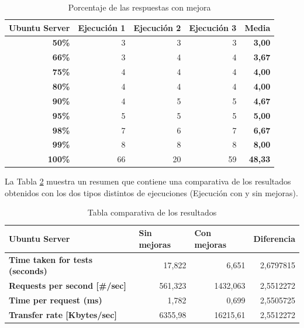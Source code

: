 \begin{table}[H]
	\centering
	\begin{tabular}{rrrrr}
		\multicolumn{1}{l}{\textbf{Ubuntu Server}} & \multicolumn{1}{l}{\textbf{Ejecución 1}} & \multicolumn{1}{l}{\textbf{Ejecución 2}} & \multicolumn{1}{l}{\textbf{Ejecución 3}} & \multicolumn{1}{l}{\textbf{Media}} \\
		\midrule
		\textbf{50\%} & 3     & 3     & 3     & \textbf{3,00} \\
		\textbf{66\%} & 3     & 4     & 4     & \textbf{3,67} \\
		\textbf{75\%} & 4     & 4     & 4     & \textbf{4,00} \\
		\textbf{80\%} & 4     & 4     & 4     & \textbf{4,00} \\
		\textbf{90\%} & 4     & 5     & 5     & \textbf{4,67} \\
		\textbf{95\%} & 5     & 5     & 5     & \textbf{5,00} \\
		\textbf{98\%} & 7     & 6     & 7     & \textbf{6,67} \\
		\textbf{99\%} & 8     & 8     & 8     & \textbf{8,00} \\
		\textbf{100\%} & 66    & 20    & 59    & \textbf{48,33} \\
	\end{tabular}%
	\caption{Porcentaje de las respuestas con mejora}
	\label{tab:mejora2}%
\end{table}%

La Tabla \ref{tab:comparativa} muestra un resumen que contiene una comparativa de los resultados obtenidos con los dos tipos distintos de ejecuciones (Ejecución con y sin mejoras).

\begin{table}[H]
	\centering
	\begin{tabular}{lrrr}
		\textbf{Ubuntu Server} & \multicolumn{1}{l}{\textbf{Sin mejoras}} & \multicolumn{1}{l}{\textbf{Con mejoras}} & \multicolumn{1}{l}{\textbf{Diferencia}} \\
		\midrule
		\textbf{Time taken for tests (seconds)} & 17,822 & 6,651 & 2,6797815 \\
		\textbf{Requests per second [\#/sec]} & 561,323 & 1432,063 & 2,5512272 \\
		\textbf{Time per request (ms)} & 1,782 & 0,699 & 2,5505725 \\
		\textbf{Transfer rate [Kbytes/sec]} & 6355,98 & 16215,61 & 2,5512272 \\
	\end{tabular}%
	\caption{Tabla comparativa de los resultados}	
	\label{tab:comparativa}%
\end{table}%

